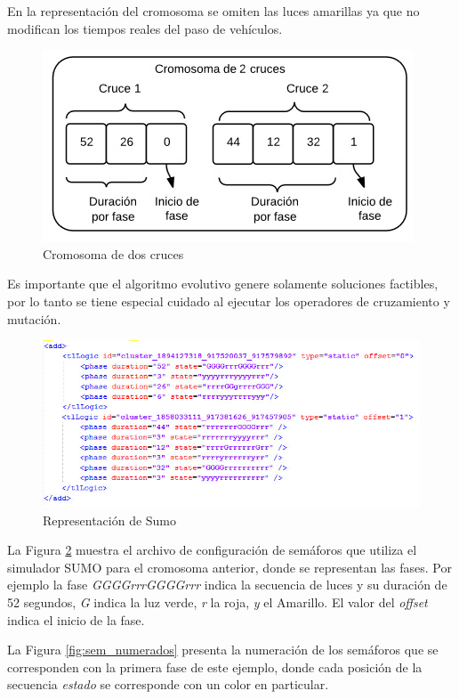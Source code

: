 En la representación del cromosoma se omiten las luces amarillas ya que no modifican los tiempos reales del paso de vehículos.

\begin{figure}[h]
	\centering
	\includegraphics[width=0.7\linewidth]{Figures/cromosoma1}
	\caption{Cromosoma de dos cruces}
	\label{fig:cromosoma1}
\end{figure}

Es importante que el algoritmo evolutivo genere solamente soluciones factibles, por lo tanto se tiene especial cuidado al ejecutar los operadores de cruzamiento y mutación.

\begin{figure}[H]
	\centering
	\includegraphics[width=\linewidth]{Figures/rep_sumo2}
	\caption{Representación de Sumo}
	\label{fig:rep_sumo}
\end{figure}

La Figura \ref{fig:rep_sumo} muestra el archivo de configuración de semáforos que utiliza el simulador SUMO para el cromosoma anterior, donde se representan las fases. Por ejemplo la fase \emph{GGGGrrrGGGGrrr} indica la secuencia de luces y su duración de 52 segundos, \emph{G} indica la luz verde, \emph{r} la roja, \emph{y} el Amarillo. El valor del \emph{offset} indica el inicio de la fase. 

La Figura \ref{fig:sem_numerados} presenta la numeración de los semáforos que se corresponden con la primera fase de este ejemplo, donde cada posición de la secuencia \emph{estado} se corresponde con un color en particular. 

